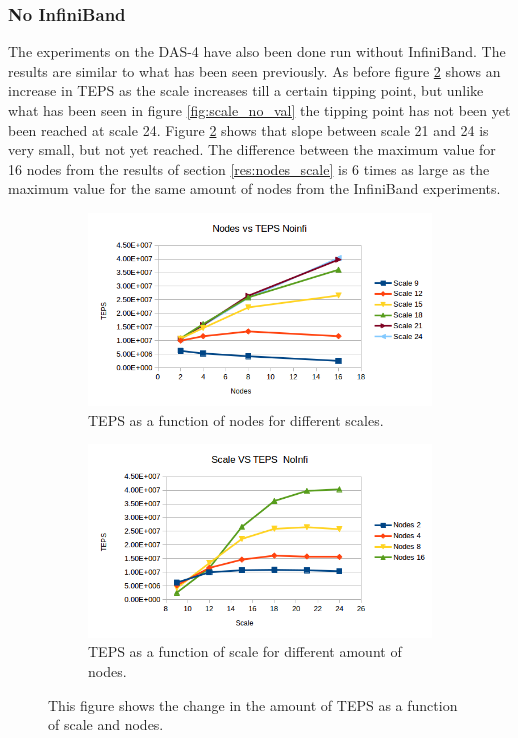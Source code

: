 \subsubsection{No InfiniBand}
The experiments on the DAS-4 have also been done run without InfiniBand. The results are similar to what has been seen previously. As before figure \ref{fig:scale_no_infini} shows an increase in TEPS as the scale increases till a certain tipping point, but unlike what has been seen in figure \ref{fig:scale_no_val} the tipping point has not been yet been reached at scale 24. Figure \ref{fig:scale_no_infini} shows that slope between scale 21 and 24 is very small, but not yet reached. The difference between the maximum value for 16 nodes from the results of section \ref{res:nodes_scale} is 6 times as large as the maximum value for the same amount of nodes from the InfiniBand experiments. 
\begin{figure}[!h]
\centering
\begin{subfigure}{.5\textwidth}
  \centering
  \includegraphics[width=\linewidth]{images/nodes_no_infini.png}
  \caption{TEPS as a function of nodes for different scales.}
  \label{fig:nodes_no_infini}
\end{subfigure}%
\begin{subfigure}{.5\textwidth}
  \centering
  \includegraphics[width=\linewidth]{images/scale_no_infini.png}
  \caption{TEPS as a function of scale for different amount of nodes.}
  \label{fig:scale_no_infini}
\end{subfigure}
\caption{This figure shows the change in the amount of TEPS as a function of scale and nodes.}
\label{fig:das_no_infini}
\end{figure}

